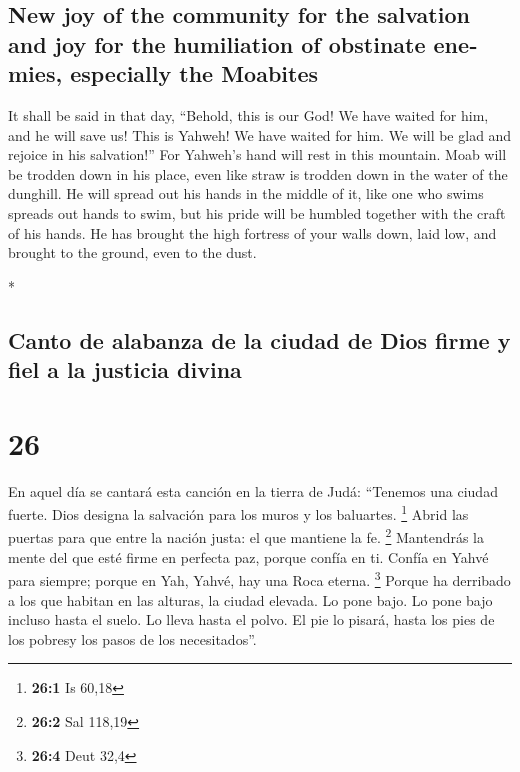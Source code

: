 \begin{paracol}{2}
\begin{otherlanguage}{english}
\hypertarget{new-joy-of-the-community-for-the-salvation-and-joy-for-the-humiliation-of-obstinate-enemies-especially-the-moabites}{%
\subsection{New joy of the community for the salvation and joy for the
humiliation of obstinate enemies, especially the
Moabites}\label{new-joy-of-the-community-for-the-salvation-and-joy-for-the-humiliation-of-obstinate-enemies-especially-the-moabites}}

 It shall be said in that day, ``Behold, this is our God!
We have waited for him, and he will save us! This is Yahweh! We have
waited for him. We will be glad and rejoice in his salvation!''
 For Yahweh's hand will rest in this mountain. Moab will
be trodden down in his place, even like straw is trodden down in the
water of the dunghill.  He will spread out his hands in
the middle of it, like one who swims spreads out hands to swim, but his
pride will be humbled together with the craft of his hands.
 He has brought the high fortress of your walls down,
laid low, and brought to the ground, even to the dust.

\end{otherlanguage}

\switchcolumn[0]*

\hypertarget{canto-de-alabanza-de-la-ciudad-de-dios-firme-y-fiel-a-la-justicia-divina}{%
\subsection{Canto de alabanza de la ciudad de Dios firme y fiel a la
justicia
divina}\label{canto-de-alabanza-de-la-ciudad-de-dios-firme-y-fiel-a-la-justicia-divina}}

\hypertarget{section-50}{%
\section{26}\label{section-50}}

 En aquel día se cantará esta canción en la tierra de
Judá: ``Tenemos una ciudad fuerte. Dios designa la salvación para los
muros y los baluartes. \footnote{\textbf{26:1} Is 60,18} 
Abrid las puertas para que entre la nación justa: el que mantiene la fe.
\footnote{\textbf{26:2} Sal 118,19}  Mantendrás la mente
del que esté firme en perfecta paz, porque confía en ti. 
Confía en Yahvé para siempre; porque en Yah, Yahvé, hay una Roca eterna.
\footnote{\textbf{26:4} Deut 32,4}  Porque ha derribado a
los que habitan en las alturas, la ciudad elevada. Lo pone bajo. Lo pone
bajo incluso hasta el suelo. Lo lleva hasta el polvo.  El
pie lo pisará, hasta los pies de los pobresy los pasos de los
necesitados''.


\end{paracol}

